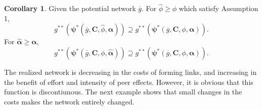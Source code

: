 \documentclass[12pt]{article}
\theoremstyle{definition}
\newtheorem{corollary}{Corollary}
\newcommand{\bm}[1]{\boldsymbol{#1}}
\begin{document}
\begin{corollary}
	Given the potential network $\overline{g}$. For $\hat{\phi} \ge \phi$ which satisfy Assumption 1,
        \[ g^{**}(\bm{\psi}^*(\overline{g}, \bm{C}, \hat{\phi}, \bm{\alpha})) \supseteq g^{**}(\bm{\psi}^*(\overline{g}, \bm{C}, \phi, \bm{\alpha})). \]
    For $\bm{\hat{\alpha}} \ge \bm{\alpha}$,
        \[ g^{**}(\bm{\psi}^*(\overline{g}, \bm{C}, \phi, \bm{\hat{\alpha}})) \supseteq g^{**}(\bm{\psi}^*(\overline{g}, \bm{C}, \phi, \bm{\alpha})). \]
\end{corollary}

The realized network is decreasing in the costs of forming links, and increasing in the benefit of effort and intensity of peer effects.
However, it is obvious that this function is discontiunous.
The next example shows that small changes in the costs makes the network entirely changed.
\end{document}
